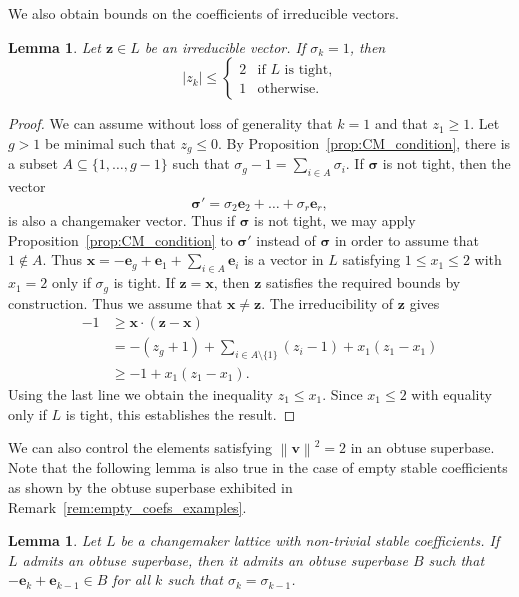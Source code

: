 \documentclass{amsart} %
\newcommand{\e}{\bm{e}}
\newcommand{\bv}{\bm{v}}
\newcommand{\bsigma}{\bm{\sigma}}
\newcommand{\norm}[1]{\left\lVert #1 \right\rVert^2}
\theoremstyle{thm}
\newtheorem{lem}[Theorem]{Lemma}
\theoremstyle{definition}
\numberwithin{equation}{section}
\begin{document}
We also obtain bounds on the coefficients of irreducible vectors.
\begin{lem}\label{lem:irreducible_bounds}
Let $\bm{z}\in L$ be an irreducible vector. If $\sigma_k=1$, then 
    \[|z_k|\leq 
    \begin{cases}
    2 &\text{if $L$ is tight,}\\
    1 &\text{otherwise.}
    \end{cases}
    \]
\end{lem}
\begin{proof}
We can assume without loss of generality that $k=1$ and that $z_1\geq 1$. Let $g>1$ be minimal such that $z_g\leq 0$. By Proposition~\ref{prop:CM_condition}, there is a subset $A\subseteq \{1,\dots, g-1\}$ such that $\sigma_g -1 =\sum_{i\in A}\sigma_i$. If $\bsigma$ is not tight, then the vector
\[
\bsigma'=\sigma_2\e_2 + \dots+ \sigma_r\e_r,
\]
is also a changemaker vector. Thus if $\bsigma$ is not tight, we may apply Proposition~\ref{prop:CM_condition} to $\bsigma'$ instead of $\bsigma$ in order to assume that $1\not\in A$. Thus $\bm{x}=-\e_g +\e_1+ \sum_{i\in A}\e_i$ is a vector in $L$ satisfying $1\leq x_1\leq 2$ with $x_1=2$ only if $\sigma_g$ is tight. If $\bm{z}=\bm{x}$, then $\bm{z}$ satisfies the required bounds by construction. Thus we assume that $\bm{x}\neq \bm{z}$. The irreducibility of $\bm{z}$ gives
\begin{align*}
    -1&\geq \bm{x}\cdot(\bm{z}-\bm{x})\\
    &=-(z_g+1)+ \sum_{i \in A\setminus\{1\}}(z_i -1) + x_1(z_1-x_1)\\
    &\geq -1 + x_1(z_1-x_1).
\end{align*}
Using the last line we obtain the inequality $z_1\leq x_1$. Since $x_1\leq 2$ with equality only if $L$ is tight, this establishes the result.
\end{proof}
We can also control the elements satisfying $\norm{\bv}=2$ in an obtuse superbase. Note that the following lemma is also true in the case of empty stable coefficients as shown by the obtuse superbase exhibited in Remark~\ref{rem:empty_coefs_examples}.
\begin{lem}\label{lem:standard_norm_twos} Let $L$ be a changemaker lattice with non-trivial stable coefficients.
If $L$ admits an obtuse superbase, then it admits an obtuse superbase $B$ such that $-\e_k+\e_{k-1}\in B$ for all $k$ such that $\sigma_k=\sigma_{k-1}$.
\end{lem}
\end{document}

